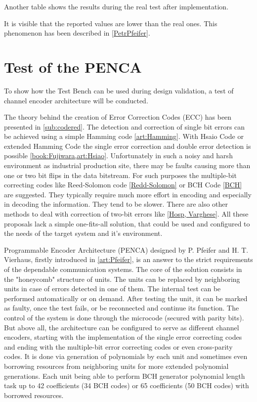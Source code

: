 Another table shows the results during the real test after implementation.

It is visible that the reported values are lower than the real ones. This phenomenon has been described in \ref{PetrPfeifer}.

\section{Test of the PENCA}
To show how the Test Bench can be used during design validation, a test of channel encoder architecture will be conducted.

The theory behind the creation of Error Correction Codes (ECC) has been presented in \autoref{sub:codered}. The detection and correction of single bit errors can be achieved using a simple Hamming code \ref{art:Hamming}. With Hsaio Code or extended Hamming Code the single error correction and double error detection is possible \ref{book:Fujiwara,art:Hsiao}. Unfortunately in such a noisy and harsh environment as industrial production site, there may be faults causing more than one or two bit flips in the data bitstream. For such purposes the multiple-bit correcting codes like Reed-Solomon code \ref{Redd-Solomon} or BCH Code \ref{BCH} are suggested. They typically require much more effort in  encoding and especially in decoding the information. They tend to be slower. There are also other methods to deal with correction of two-bit errors like \ref{Hosp, Varghese}. All these proposals lack a simple one-fits-all solution, that could be used and configured to the needs of the target system and it's environment.

Programmable Encoder Architecture (PENCA) designed by P. Pfeifer and H. T. Vierhaus, firstly introduced in \ref{art:Pfeifer}, is an answer to the strict requirements of the dependable communication systems. The core of the solution consists in the "honeycomb" structure of units. The units can be replaced by neighboring units in case of errors detected in one of them. The internal test can be performed automatically or on demand. After testing the unit, it can be marked as faulty, once the test fails, or be reconnected and continue its function. The control of the system is done through the microcode (secured with parity bits). But above all, the architecture can be configured to serve as different channel encoders, starting with the implementation of the single error correcting codes and ending with the multiple-bit error correcting codes or even cross-parity codes. It is done via generation of polynomials by each unit and sometimes even borrowing resources from neighboring units for more extended polynomial generations. Each unit being able to perform BCH generator polynomial length task up to 42 coefficients (34 BCH codes) or 65 coefficients (50 BCH codes) with borrowed resources.

